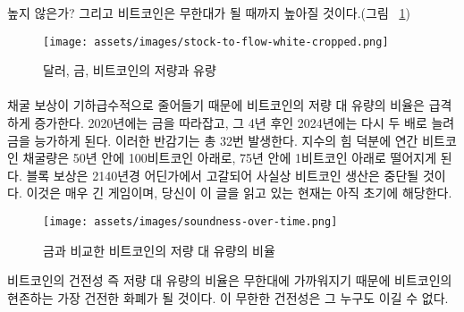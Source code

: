 \begin{comment}	
	How high? Well, it turns out that Bitcoin will get infinitely hard (see
	Figure~\ref{fig:stock-to-flow-white-cropped}).
\end{comment}
높지 않은가? 그리고 비트코인은 무한대가 될 때까지 높아질 것이다.(그림 ~\ref{fig:stock-to-flow-white-cropped})

\begin{figure}
	\texttt{[image: assets/images/stock-to-flow-white-cropped.png]}
	\caption{달러, 금, 비트코인의 저량과 유량}
	\label{fig:stock-to-flow-white-cropped}
\end{figure}

\paragraph{}
\begin{comment}	
	Due to an exponential decrease of the mining reward, the flow of new
	bitcoin will diminish resulting in a sky-rocketing stock-to-flow ratio.
	It will catch up to gold in 2020, only to surpass it four years later by
	doubling its soundness again. Such a doubling will occur 32 times in
	total. Thanks to the power of exponentials, the number of bitcoin mined
	per year will drop below 100 bitcoin in 50 years and below 1 bitcoin in
	75 years. The global faucet which is the block reward will dry up
	somewhere around the year 2140, effectively stopping the production of
	bitcoin. This is a long game. If you are reading this, you are still
	early.
\end{comment}
채굴 보상이 기하급수적으로 줄어들기 때문에 비트코인의 저량 대 유량의 비율은 급격하게 증가한다.
2020년에는 금을 따라잡고, 그 4년 후인 2024년에는 다시 두 배로 늘려 금을 능가하게 된다.
이러한 반감기는 총 32번 발생한다.
지수의 힘 덕분에 연간 비트코인 채굴량은 50년 안에 100비트코인 아래로, 75년 안에 1비트코인 아래로 떨어지게 된다.
블록 보상은 2140년경 어딘가에서 고갈되어 사실상 비트코인 생산은 중단될 것이다. 
이것은 매우 긴 게임이며, 당신이 이 글을 읽고 있는 현재는 아직 초기에 해당한다.

\begin{figure}
	\texttt{[image: assets/images/soundness-over-time.png]}
	\caption{금과 비교한 비트코인의 저량 대 유량의 비율}
	\label{fig:soundness-over-time}
\end{figure}

\begin{comment}	
	As bitcoin approaches infinite stock to flow ratio it will be the
	soundest money in existence. Infinite soundness is hard to beat.
\end{comment}
비트코인의 건전성 즉 저량 대 유량의 비율은 무한대에 가까워지기 때문에
비트코인의 현존하는 가장 건전한 화폐가 될 것이다.
이 무한한 건전성은 그 누구도 이길 수 없다.

